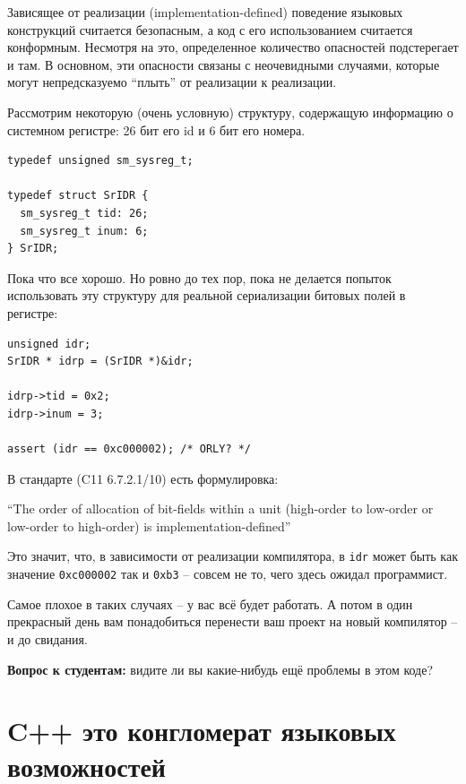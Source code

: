 \documentclass[a4paper,12pt,oneside]{book}
\newif\ifanswers
\begin{document}
Зависящее от реализации (implementation-defined) поведение языковых конструкций считается безопасным, а код с его использованием считается конформным. Несмотря на это, определенное количество опасностей подстерегает и там. В основном, эти опасности связаны с неочевидными случаями, которые могут непредсказуемо ``плыть'' от реализации к реализации.

Рассмотрим некоторую (очень условную) структуру, содержащую информацию о системном регистре: 26 бит его id и 6 бит его номера.

\begin{lstlisting}
typedef unsigned sm_sysreg_t;

typedef struct SrIDR {
  sm_sysreg_t tid: 26;
  sm_sysreg_t inum: 6;
} SrIDR;
\end{lstlisting}

Пока что все хорошо. Но ровно до тех пор, пока не делается попыток использовать эту структуру для реальной сериализации битовых полей в регистре:

\begin{lstlisting}
unsigned idr;
SrIDR * idrp = (SrIDR *)&idr;

idrp->tid = 0x2;
idrp->inum = 3;

assert (idr == 0xc000002); /* ORLY? */
\end{lstlisting}

В стандарте (C11 6.7.2.1/10) есть формулировка: 

``The order of allocation of bit-fields within a unit (high-order to low-order or low-order to high-order) is implementation-defined''

Это значит, что, в зависимости от реализации компилятора, в \lstinline!idr! может быть как значение \lstinline!0xc000002! так и \lstinline!0xb3! -- совсем не то, чего здесь ожидал программист.

Самое плохое в таких случаях -- у вас всё будет работать. А потом в один прекрасный день вам понадобиться перенести ваш проект на новый компилятор -- и до свидания.

\textbf{Вопрос к студентам:} видите ли вы какие-нибудь ещё проблемы в этом коде?

\ifanswers
Правильный ответ: разумеется тип \lstinline!unsigned! не обязан занимать ровно 32 бита. Это также implementation-defined будет ли он таким. Для верности в таких случаях лучше использовать \lstinline!uint32_t!.
\fi

\section{C++ это конгломерат языковых возможностей}\label{CppNature}
\end{document}
